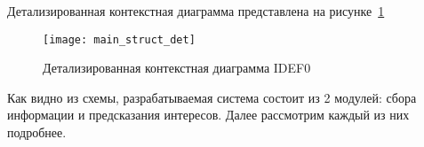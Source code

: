 Детализированная контекстная диаграмма представлена на рисунке~\ref{f:main_struct_det}

\begin{figure}[h]
	\centering
	\vspace{\toppaddingoffigure}
	\texttt{[image: main\_struct\_det]}
	\caption{Детализированная контекстная диаграмма IDEF0}
	\label{f:main_struct_det}
\end{figure}

Как видно из схемы, разрабатываемая система состоит из 2 модулей: сбора информации и предсказания интересов. Далее рассмотрим каждый из них подробнее.







